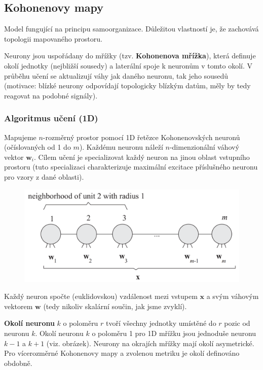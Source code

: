 \documentclass[11pt]{report} %
\renewcommand{\vec}[1]{\mathbf{#1}}
\numberwithin{equation}{section}
\begin{document}
\subsection{Kohonenovy mapy}
Model fungující na principu samoorganizace. Důležitou vlastností je, že zachovává topologii mapovaného prostoru.

Neurony jsou uspořádany do mřížky (tzv. \textbf{Kohonenova mřížka}), která definuje okolí jednotky (nejbližší sousedy) a laterální spoje k neuronům v tomto okolí. V průběhu učení se aktualizují váhy jak daného neuronu, tak jeho sousedů (motivace: blízké neurony odpovídají topologicky blízkým datům, měly by tedy reagovat na podobné signály).

\subsubsection{Algoritmus učení (1D)}
Mapujeme $n$-rozměrný prostor pomocí 1D řetězce Kohonenovských neuronů (očíslovaných od 1 do $m$). Každému neuronu náleží $n$-dimenzionální váhový vektor $\vec{w}_i$. Cílem učení je specializovat každý neuron na jinou oblast vstupního prostoru (tuto specializaci charakterizuje maximální excitace příslušného neuronu pro vzory z dané oblasti).

\begin{figure}[h]
	\centering
	\includegraphics[scale=0.7]{img/kohonen1d.png}
\end{figure}

Každý neuron spočte (euklidovskou) vzdálenost mezi vstupem $\vec{x}$ a svým váhovým vektorem $\vec{w}$ (tedy nikoliv skalární součin, jak jsme zvyklí).

\textbf{Okolí neuronu} $k$ o poloměru $r$ tvoří všechny jednotky umístěné do $r$ pozic od neuronu $k$. Okolí neuronu $k$ o poloměru 1 pro 1D mřížku jsou jednoduše neuronu $k-1$ a $k+1$ (viz. obrázek). Neurony na okrajích mřížky mají okolí asymetrické. Pro vícerozměrné Kohonenovy mapy a zvolenou metriku je okolí definováno obdobně.
\end{document}
